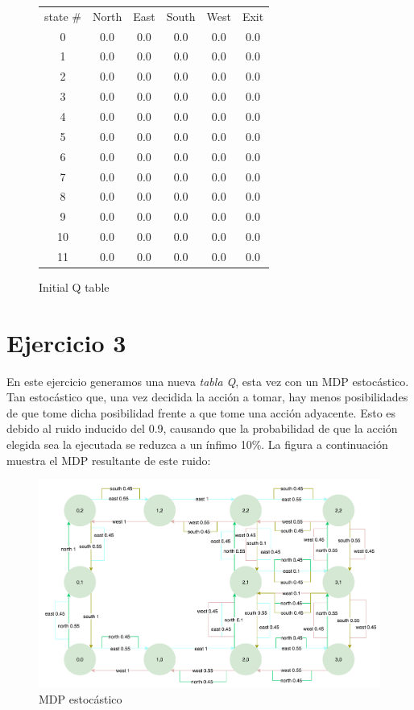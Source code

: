 \documentclass[12pt]{article}
\begin{document}
\begin{figure}[h]
    \centering
        \begin{tabular}{*{6}{c}}
            state \# & North & East & South & West & Exit\\
            0 & 0.0 & 0.0 & 0.0 & 0.0 & 0.0 \\
            1 & 0.0 & 0.0 & 0.0 & 0.0 & 0.0 \\
            2 & 0.0 & 0.0 & 0.0 & 0.0 & 0.0 \\
            3 & 0.0 & 0.0 & 0.0 & 0.0 & 0.0 \\
            4 & 0.0 & 0.0 & 0.0 & 0.0 & 0.0 \\
            5 & 0.0 & 0.0 & 0.0 & 0.0 & 0.0 \\
            6 & 0.0 & 0.0 & 0.0 & 0.0 & 0.0 \\
            7 & 0.0 & 0.0 & 0.0 & 0.0 & 0.0 \\
            8 & 0.0 & 0.0 & 0.0 & 0.0 & 0.0 \\
            9 & 0.0 & 0.0 & 0.0 & 0.0 & 0.0 \\
            10 & 0.0 & 0.0 & 0.0 & 0.0 & 0.0 \\
            11 & 0.0 & 0.0 & 0.0 & 0.0 & 0.0 \\
        \end{tabular}
    \caption{Initial Q table}
    \label{fig:test}
\end{figure}

\newpage
\section{Ejercicio 3}

En este ejercicio generamos una nueva \textit{tabla Q}, esta vez con un MDP estocástico. Tan estocástico que, una vez decidida la acción a tomar, hay menos posibilidades de que tome dicha posibilidad frente a que tome una acción adyacente. Esto es debido al ruido inducido del 0.9, causando que la probabilidad de que la acción elegida sea la ejecutada se reduzca a un ínfimo 10\%. La figura a continuación muestra el MDP resultante de este ruido:

\begin{figure}[h]
    \includegraphics[width=\textwidth]{MDP_nondeterministic}
    \caption{MDP estocástico}
\end{figure}
\end{document}
